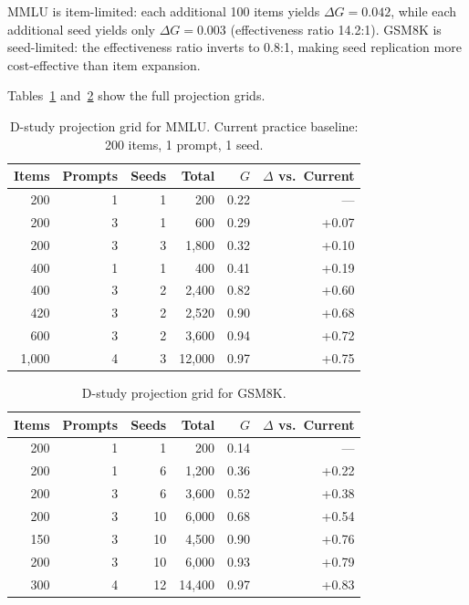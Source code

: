 \documentclass[11pt]{article}
\begin{document}
MMLU is item-limited: each additional 100 items yields $\Delta G = 0.042$, while each additional seed yields only $\Delta G = 0.003$ (effectiveness ratio 14.2:1). GSM8K is seed-limited: the effectiveness ratio inverts to 0.8:1, making seed replication more cost-effective than item expansion.

Tables~\ref{tab:dstudy_mmlu} and~\ref{tab:dstudy_gsm8k} show the full projection grids.

\begin{table}[t]
\centering
\caption{D-study projection grid for MMLU. Current practice baseline: 200 items, 1 prompt, 1 seed.}
\label{tab:dstudy_mmlu}
\small
\begin{tabular}{rrrrrr}
\toprule
Items & Prompts & Seeds & Total & $G$ & $\Delta$ vs.\ Current \\
\midrule
200 & 1 & 1 & 200 & 0.22 & --- \\
200 & 3 & 1 & 600 & 0.29 & +0.07 \\
200 & 3 & 3 & 1{,}800 & 0.32 & +0.10 \\
400 & 1 & 1 & 400 & 0.41 & +0.19 \\
400 & 3 & 2 & 2{,}400 & 0.82 & +0.60 \\
420 & 3 & 2 & 2{,}520 & 0.90 & +0.68 \\
600 & 3 & 2 & 3{,}600 & 0.94 & +0.72 \\
1{,}000 & 4 & 3 & 12{,}000 & 0.97 & +0.75 \\
\bottomrule
\end{tabular}
\end{table}

\begin{table}[t]
\centering
\caption{D-study projection grid for GSM8K.}
\label{tab:dstudy_gsm8k}
\small
\begin{tabular}{rrrrrr}
\toprule
Items & Prompts & Seeds & Total & $G$ & $\Delta$ vs.\ Current \\
\midrule
200 & 1 & 1 & 200 & 0.14 & --- \\
200 & 1 & 6 & 1{,}200 & 0.36 & +0.22 \\
200 & 3 & 6 & 3{,}600 & 0.52 & +0.38 \\
200 & 3 & 10 & 6{,}000 & 0.68 & +0.54 \\
150 & 3 & 10 & 4{,}500 & 0.90 & +0.76 \\
200 & 3 & 10 & 6{,}000 & 0.93 & +0.79 \\
300 & 4 & 12 & 14{,}400 & 0.97 & +0.83 \\
\bottomrule
\end{tabular}
\end{table}
\end{document}
